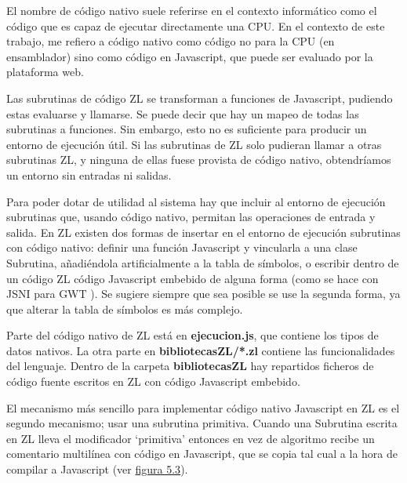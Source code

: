 \documentclass{report}
\begin{document}
	
	El nombre de código nativo suele referirse en el contexto informático como el código que es capaz de ejecutar directamente una CPU. En el contexto de este trabajo, me refiero a código nativo como código no para la CPU (en ensamblador) sino como código en Javascript, que puede ser evaluado por la plataforma web. 
	
	\vspace{10px}
	
	Las subrutinas de código ZL se transforman a funciones de Javascript, pudiendo estas evaluarse y llamarse. Se puede decir que hay un mapeo de todas las subrutinas a funciones. Sin embargo, esto no es suficiente para producir un entorno de ejecución útil. Si las subrutinas de ZL solo pudieran llamar a otras subrutinas ZL, y ninguna de ellas fuese provista de código nativo, obtendríamos un entorno sin entradas ni salidas. 
	
	\vspace{10px}
	
	Para poder dotar de utilidad al sistema hay que incluir al entorno de ejecución subrutinas que, usando código nativo, permitan las operaciones de entrada y salida. En ZL existen dos formas de insertar en el entorno de ejecución subrutinas con código nativo: definir una función Javascript y vincularla a una clase Subrutina, añadiéndola artificialmente a la tabla de símbolos, o escribir dentro de un código ZL código Javascript embebido de alguna forma (como se hace con JSNI para GWT \cite{jnsigwt}). Se sugiere siempre que sea posible se use la segunda forma, ya que alterar la tabla de símbolos es más complejo.
	
	\vspace{10px}
	
	Parte del código nativo de ZL está en \textbf{ejecucion.js}, que contiene los tipos de datos nativos. La otra parte en \textbf{bibliotecasZL/*.zl} contiene las funcionalidades del lenguaje. Dentro de la carpeta \textbf{bibliotecasZL} hay repartidos ficheros de código fuente escritos en ZL con código Javascript embebido.
	
	\vspace{10px}
	
	\label{subrutinasprimitivas}
	El mecanismo más sencillo para implementar código nativo Javascript en ZL es el segundo mecanismo; usar una subrutina primitiva. Cuando una Subrutina escrita en ZL lleva el modificador `primitiva' entonces en vez de algoritmo recibe un comentario multilínea con código en Javascript, que se copia tal cual a la hora de compilar a Javascript (ver \hyperref[fig:zlyjs]{figura 5.3}).
	
\end{document}
